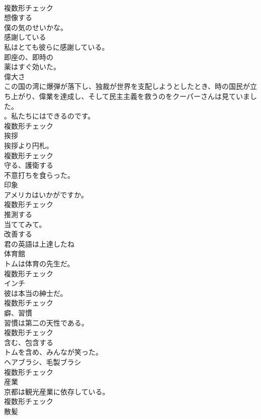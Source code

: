 \documentclass[8pt]{extreport}
\begin{document}
\begin{CJK}{UTF8}{min}
\\	複数形チェック
\\	[動詞]	想像する	
\\	僕の気のせいかな。	
\\	[形容詞]	感謝している	
\\	私はとても彼らに感謝している。	
\\	[形容詞]	即座の、即時の	
\\	薬はすぐ効いた。	
\\	[名詞]	偉大さ	
\\	この国の湾に爆弾が落下し、独裁が世界を支配しようとしたとき、時の国民が立ち上がり、偉業を達成し、そして民主主義を救うのをクーパーさんは見ていました。
\\	。私たちにはできるのです。	
\\	複数形チェック
\\	[名詞]	挨拶	
\\	挨拶より円札。	
\\	複数形チェック
\\	[動詞]	守る、護衛する	
\\	不意打ちを食らった。	
\\	[名詞]	印象	
\\	アメリカはいかがですか。	
\\	複数形チェック
\\	[動詞]	推測する	
\\	当ててみて。	
\\	[動詞]	改善する	
\\	君の英語は上達したね	
\\	[名詞]	体育館	
\\	トムは体育の先生だ。	
\\	複数形チェック
\\	[名詞]	インチ	
\\	彼は本当の紳士だ。	
\\	複数形チェック
\\	[名詞]	癖、習慣	
\\	習慣は第二の天性である。	
\\	複数形チェック
\\	[動詞]	含む、包含する	
\\	トムを含め、みんなが笑った。	
\\	[名詞]	ヘアブラシ、毛製ブラシ	
\\	複数形チェック
\\	[名詞]	産業	
\\	京都は観光産業に依存している。	
\\	複数形チェック
\\	[名詞]	散髪	

\end{CJK}
\end{document}
